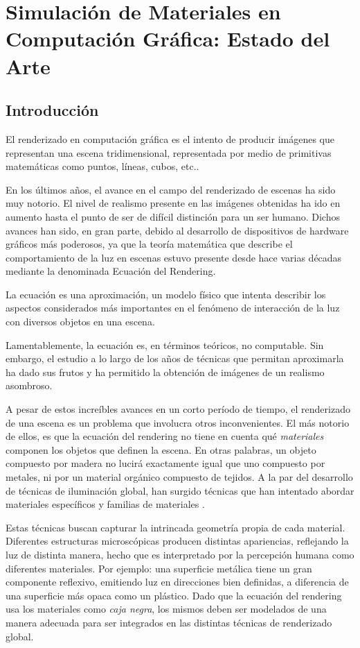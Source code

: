 
\chapter[Estado del Arte]{Simulación de Materiales en Computación Gráfica: Estado del Arte}
\section{Introducción} %
El renderizado en computación gráfica es el intento de producir imágenes que representan una escena tridimensional, representada por medio de primitivas matemáticas como puntos, líneas, cubos, etc..

En los últimos años, el avance en el campo del renderizado de escenas ha sido muy notorio. El nivel de realismo presente en las imágenes obtenidas ha ido en aumento hasta el punto de ser de difícil distinción para un ser humano. Dichos avances han sido, en gran parte, debido al desarrollo de dispositivos de hardware gráficos más poderosos, ya que la teoría matemática que describe el comportamiento de la luz en escenas estuvo presente desde hace varias décadas \cite{Kajiya} mediante la denominada Ecuación del Rendering.


La ecuación es una aproximación, un modelo físico que intenta describir los aspectos considerados más importantes en el fenómeno de interacción de la luz con diversos objetos en una escena.

Lamentablemente, la ecuación es, en términos teóricos, no computable. Sin embargo, el estudio a lo largo de los años de técnicas que permitan aproximarla ha dado sus frutos y ha permitido la obtención de imágenes de un realismo asombroso.

A pesar de estos increíbles avances en un corto período de tiempo, el renderizado de una escena es un problema que involucra otros inconvenientes. El más notorio de ellos, es que la ecuación del rendering no tiene en cuenta qué {\em materiales} componen los objetos que definen la escena. En otras palabras, un objeto compuesto por madera no lucirá exactamente igual que uno compuesto por metales, ni por un material orgánico compuesto de tejidos. A la par del desarrollo de técnicas de iluminación global, han surgido técnicas que han intentado abordar materiales específicos \cite{} y familias de materiales \cite{}.

Estas técnicas buscan capturar la intrincada geometría propia de cada material. Diferentes estructuras microscópicas producen distintas apariencias, reflejando la luz de distinta manera, hecho que es interpretado por la percepción humana como diferentes materiales. Por ejemplo: una superficie metálica tiene un gran componente reflexivo, emitiendo luz en direcciones bien definidas, a diferencia de una superficie más opaca como un plástico. Dado que la ecuación del rendering usa los materiales como {\em caja negra}, los mismos deben ser modelados de una manera adecuada para ser integrados en las distintas técnicas de renderizado global.

